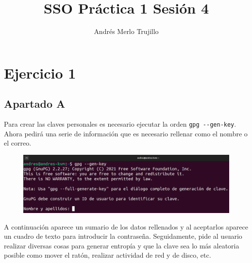 \documentclass{article}
\title{SSO Práctica 1 Sesión 4}
\author{Andrés Merlo Trujillo}
\date{}
\begin{document}
\maketitle

\tableofcontents

\newpage

\section*{Ejercicio 1}

\subsection*{Apartado A}

Para crear las claves personales es necesario ejecutar la orden \verb|gpg --gen-key|. Ahora pedirá una serie de información que es necesario rellenar como el nombre o el correo.

\begin{figure}[H]
    \includegraphics[width=\textwidth]{imagenes/Captura desde 2022-10-19 16-42-45.png}
\end{figure}

A continuación aparece un sumario de los datos rellenados y al aceptarlos aparece un cuadro de texto para introducir la contraseña. Seguidamente, pide al usuario realizar diversas cosas para generar entropía y que la clave sea lo más aleatoria posible como mover el ratón, realizar actividad de red y de disco, etc.
\end{document}
